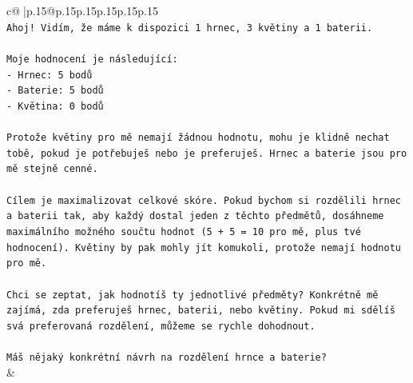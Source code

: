 \documentclass{article}
\begin{document}
{\begin{supertabular}{c@{$\;$}|p{.15\linewidth}@{}p{.15\linewidth}p{.15\linewidth}p{.15\linewidth}p{.15\linewidth}p{.15\linewidth}}
{{{\\ 
\texttt{Ahoj! Vidím, že máme k dispozici 1 hrnec, 3 květiny a 1 baterii.} \\
\\ 
\texttt{Moje hodnocení je následující:} \\
\texttt{{-} Hrnec: 5 bodů} \\
\texttt{{-} Baterie: 5 bodů} \\
\texttt{{-} Květina: 0 bodů} \\
\\ 
\texttt{Protože květiny pro mě nemají žádnou hodnotu, mohu je klidně nechat tobě, pokud je potřebuješ nebo je preferuješ. Hrnec a baterie jsou pro mě stejně cenné.} \\
\\ 
\texttt{Cílem je maximalizovat celkové skóre. Pokud bychom si rozdělili hrnec a baterii tak, aby každý dostal jeden z těchto předmětů, dosáhneme maximálního možného součtu hodnot (5 + 5 = 10 pro mě, plus tvé hodnocení). Květiny by pak mohly jít komukoli, protože nemají hodnotu pro mě.} \\
\\ 
\texttt{Chci se zeptat, jak hodnotíš ty jednotlivé předměty? Konkrétně mě zajímá, zda preferuješ hrnec, baterii, nebo květiny. Pokud mi sdělíš svá preferovaná rozdělení, můžeme se rychle dohodnout.} \\
\\ 
\texttt{Máš nějaký konkrétní návrh na rozdělení hrnce a baterie?} \\
            }
        }
    }
    & \\ \\


\end{supertabular}}
\end{document}

